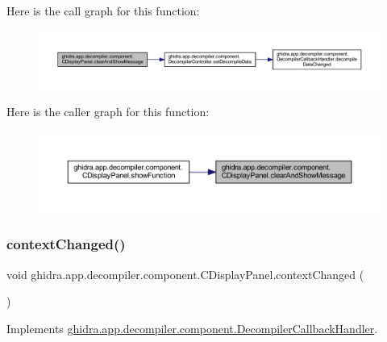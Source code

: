 Here is the call graph for this function\+:
\nopagebreak
\begin{figure}[H]
\begin{center}
\leavevmode
\includegraphics[width=350pt]{classghidra_1_1app_1_1decompiler_1_1component_1_1_c_display_panel_a4e97fabe9ddab409c2008538a433c297_cgraph}
\end{center}
\end{figure}
Here is the caller graph for this function\+:
\nopagebreak
\begin{figure}[H]
\begin{center}
\leavevmode
\includegraphics[width=350pt]{classghidra_1_1app_1_1decompiler_1_1component_1_1_c_display_panel_a4e97fabe9ddab409c2008538a433c297_icgraph}
\end{center}
\end{figure}
\mbox{\label{classghidra_1_1app_1_1decompiler_1_1component_1_1_c_display_panel_ae71133a49eecc3ace39aa4d2eb671c4b}} 
\subsubsection{\texorpdfstring{contextChanged()}{contextChanged()}}
{\footnotesize\ttfamily void ghidra.\+app.\+decompiler.\+component.\+C\+Display\+Panel.\+context\+Changed (\begin{DoxyParamCaption}{ }\end{DoxyParamCaption})\hspace{0.3cm}{\ttfamily [inline]}}



Implements \mbox{\hyperlink{interfaceghidra_1_1app_1_1decompiler_1_1component_1_1_decompiler_callback_handler_ae908ba10bddcb8d863eae48d8f1887a0}{ghidra.\+app.\+decompiler.\+component.\+Decompiler\+Callback\+Handler}}.




